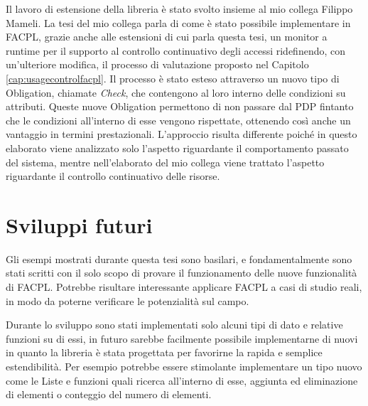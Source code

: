 Il lavoro di estensione della libreria è stato svolto insieme al mio collega Filippo Mameli. La tesi del mio collega parla di come è stato possibile implementare in \ac{FACPL}, grazie anche alle estensioni di cui parla questa tesi, un monitor a runtime per il supporto al controllo continuativo degli accessi ridefinendo, con un'ulteriore modifica, il processo di valutazione proposto nel Capitolo \ref{cap:usagecontrolfacpl}. Il processo è stato esteso attraverso un nuovo tipo di Obligation, chiamate \textit{Check}, che contengono al loro interno delle condizioni su attributi. Queste nuove Obligation permettono di non passare dal \ac{PDP} fintanto che le condizioni all'interno di esse vengono rispettate, ottenendo così anche un vantaggio in termini prestazionali. L'approccio risulta differente poiché in questo elaborato viene analizzato solo l'aspetto riguardante il comportamento passato del sistema, mentre nell'elaborato del mio collega viene trattato l'aspetto riguardante il controllo continuativo delle risorse.

\section{Sviluppi futuri}
\label{sec:futuro}

Gli esempi mostrati durante questa tesi sono basilari, e fondamentalmente sono stati scritti con il solo scopo di provare il funzionamento delle nuove funzionalità di \ac{FACPL}. Potrebbe risultare interessante applicare \ac{FACPL} a casi di studio reali, in modo da poterne verificare le potenzialità sul campo.\par
Durante lo sviluppo sono stati implementati solo alcuni tipi di dato e relative funzioni su di essi, in futuro sarebbe facilmente possibile implementarne di nuovi in quanto la libreria è stata
progettata per favorirne la rapida e semplice estendibilità. Per esempio potrebbe essere stimolante implementare un tipo nuovo come le Liste e funzioni quali ricerca all'interno di esse, aggiunta ed eliminazione di elementi o conteggio del numero di elementi.